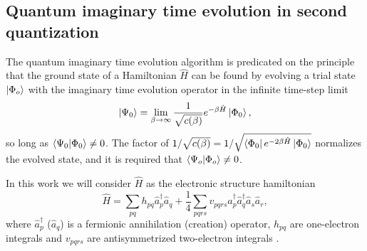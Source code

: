 \documentclass[aip,jcp,amsmath,amssymb, reprint]{revtex4-1}
\newcommand{\cop}[1]{\hat{a}^{\dagger}_{#1}}
\newcommand{\aop}[1]{\hat{a}_{#1}}
\begin{document}
\subsection{Quantum imaginary time evolution in second quantization}
The quantum imaginary time evolution algorithm is predicated on the principle that the ground state of a Hamiltonian $\hat{H}$ can be found by evolving a trial state $\ket{\Phi_o}$ with the imaginary time evolution operator in the infinite time-step limit
\begin{equation}
\ket{\Psi_0} = \lim_{\beta \rightarrow \infty} \frac{1}{\sqrt{ c(\beta) }} e^{-\beta \hat{H} } \ket{\Phi_0},
\end{equation}
so long as  $\braket{\Psi_0 | \Phi_0} \neq 0$.
The factor of $1 / \sqrt{ c(\beta) } = 1/ \sqrt{ \bra{\Phi_0} e^{-2 \beta \hat{H}} \ket{\Phi_0}}$ normalizes the evolved state, and it is required that $\braket{\Psi_o | \Phi_o} \neq 0$.  

In this work we will consider $\hat{H}$ as the electronic structure hamiltonian
\begin{equation}
\hat{H} = \sum_{pq} h_{pq} \cop{p} \aop{q}
+ \frac{1}{4} \sum_{pqrs}
v_{pqrs} \cop{p} \cop{q} \aop{s} \aop{r},
\end{equation}
where $\cop{p}$ ($\aop{q}$) is a fermionic annihilation (creation) operator, $h_{pq}$ are one-electron integrals and $v_{pqrs}$
are antisymmetrized two-electron integrals \cite{crawford2000introduction}.
\end{document}
